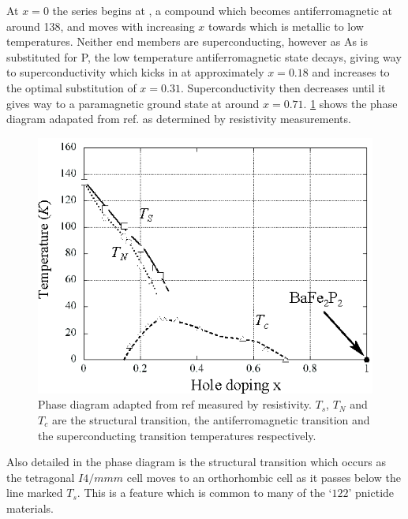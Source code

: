 At $x=0$ the \BaFePAs series begins at \BaFeAs, a compound which becomes antiferromagnetic at around \unit{138}{\kelvin}, and moves with increasing $x$ towards \BaFeP which is metallic to low temperatures. Neither end members are superconducting, however as As is substituted for P, the low temperature antiferromagnetic state decays, giving way to superconductivity which kicks in at approximately $x=0.18$ and increases to the optimal substitution of $x=0.31$. Superconductivity then decreases until it gives way to a paramagnetic ground state at around $x=0.71$. \Fig\ref{Fig:Intro:PhaseDiagram} shows the phase diagram adapated from ref. \cite{Nakai2010a} as determined by resistivity measurements. 
\begin{figure}[htbp]
    \begin{center}
        \includegraphics[scale=1.0]{Chapter-Introduction/Figures/PhaseDiagram/PhaseDiagram}
        \caption{Phase diagram adapted from ref \cite{Nakai2010a} measured by resistivity. $T_s$, $T_N$ and $T_c$ are the structural transition, the antiferromagnetic transition and the superconducting transition temperatures respectively.}
        \label{Fig:Intro:PhaseDiagram}
    \end{center}
\end{figure}
Also detailed in the phase diagram is the structural transition which occurs as the tetragonal $I4/mmm$ cell moves to an orthorhombic cell as it passes below the line marked $T_s$. This is a feature which is common to many of the `$122$' pnictide materials.

